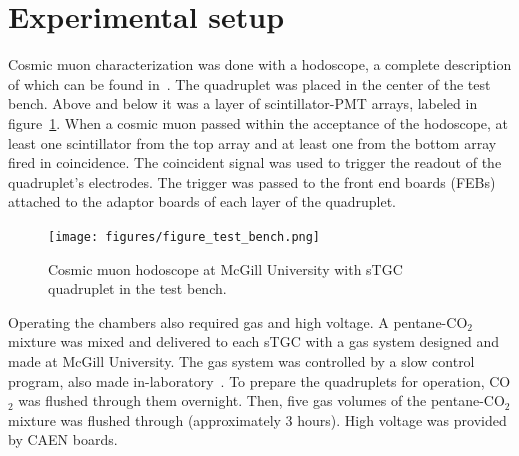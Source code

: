 \section{Experimental setup}

Cosmic muon characterization was done with a hodoscope, a complete description of which can be found in~\cite{lefebvre_thesis}.  The quadruplet was placed in the center of the test bench. Above and below it was a layer of scintillator-PMT arrays, labeled in figure~\ref{fig:hodoscope}. When a cosmic muon passed within the acceptance of the hodoscope, at least one scintillator from the top array and at least one from the bottom array fired in coincidence. The coincident signal was used to trigger the readout of the quadruplet's electrodes. The trigger was passed to the front end boards (FEBs) attached to the adaptor boards of each layer of the quadruplet.

\begin{figure}
    \centering
    \texttt{[image: figures/figure\_test\_bench.png]}
    \caption{Cosmic muon hodoscope at McGill University with sTGC quadruplet in the test bench.}
    \label{fig:hodoscope}
\end{figure}

Operating the chambers also required gas and high voltage. A pentane-CO$_{2}$ mixture was mixed and delivered to each sTGC with a gas system designed and made at McGill University. The gas system was controlled by a slow control program, also made in-laboratory~\cite{keyes_development_2017}. To prepare the quadruplets for operation, CO$_{2}$ was flushed through them overnight. Then, five gas volumes of the pentane-CO$_{2}$ mixture was flushed through (approximately 3 hours). High voltage was provided by CAEN boards. 



